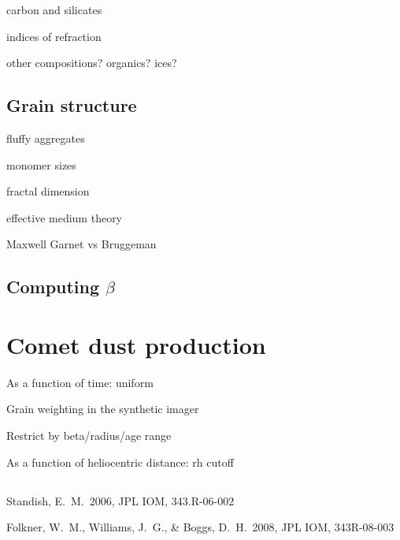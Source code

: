 \documentclass[12pt,letterpaper]{article}
\begin{document}
carbon and silicates

indices of refraction

other compositions?  organics?  ices?

\subsection{Grain structure}

fluffy aggregates

monomer sizes

fractal dimension

effective medium theory

Maxwell Garnet vs Bruggeman


\subsection{Computing $\beta$}



\section{Comet dust production}\label{sec:dustproduction}

As a function of time: uniform

Grain weighting in the synthetic imager

Restrict by beta/radius/age range

As a function of heliocentric distance: rh cutoff




\subsection{}


\begin{thebibliography}{}
 Standish, E.~M.\ 2006, JPL IOM,
  343.R-06-002

 Folkner, W.~M., Williams,
  J.~G., \& Boggs, D.~H.\ 2008, JPL IOM, 343R-08-003

\end{thebibliography}
\end{document}
